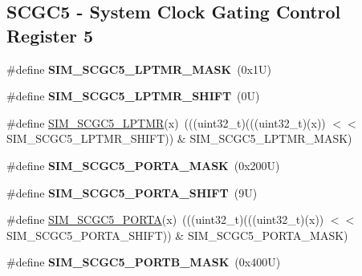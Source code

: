\subsection*{S\+C\+G\+C5 -\/ System Clock Gating Control Register 5}
\begin{DoxyCompactItemize}
\item 
\mbox{\label{group___s_i_m___register___masks_ga6f63b73e0ad63163df381c795d583cc1}} 
\#define {\bfseries S\+I\+M\+\_\+\+S\+C\+G\+C5\+\_\+\+L\+P\+T\+M\+R\+\_\+\+M\+A\+SK}~(0x1\+U)
\item 
\mbox{\label{group___s_i_m___register___masks_ga9b3669f3f4f380e18133785d6356c56c}} 
\#define {\bfseries S\+I\+M\+\_\+\+S\+C\+G\+C5\+\_\+\+L\+P\+T\+M\+R\+\_\+\+S\+H\+I\+FT}~(0\+U)
\item 
\#define \mbox{\hyperlink{group___s_i_m___register___masks_gab1ead6f54c5176113ceb9b609d7287b7}{S\+I\+M\+\_\+\+S\+C\+G\+C5\+\_\+\+L\+P\+T\+MR}}(x)~(((uint32\+\_\+t)(((uint32\+\_\+t)(x)) $<$$<$ S\+I\+M\+\_\+\+S\+C\+G\+C5\+\_\+\+L\+P\+T\+M\+R\+\_\+\+S\+H\+I\+FT)) \& S\+I\+M\+\_\+\+S\+C\+G\+C5\+\_\+\+L\+P\+T\+M\+R\+\_\+\+M\+A\+SK)
\item 
\mbox{\label{group___s_i_m___register___masks_ga9c4853233394870202cccd7844fc8a56}} 
\#define {\bfseries S\+I\+M\+\_\+\+S\+C\+G\+C5\+\_\+\+P\+O\+R\+T\+A\+\_\+\+M\+A\+SK}~(0x200\+U)
\item 
\mbox{\label{group___s_i_m___register___masks_gaa7a1683eaa07a5c5adcaddf4b99ed83a}} 
\#define {\bfseries S\+I\+M\+\_\+\+S\+C\+G\+C5\+\_\+\+P\+O\+R\+T\+A\+\_\+\+S\+H\+I\+FT}~(9\+U)
\item 
\#define \mbox{\hyperlink{group___s_i_m___register___masks_ga4f6394bfabad2f1c8669037fd0ea30e7}{S\+I\+M\+\_\+\+S\+C\+G\+C5\+\_\+\+P\+O\+R\+TA}}(x)~(((uint32\+\_\+t)(((uint32\+\_\+t)(x)) $<$$<$ S\+I\+M\+\_\+\+S\+C\+G\+C5\+\_\+\+P\+O\+R\+T\+A\+\_\+\+S\+H\+I\+FT)) \& S\+I\+M\+\_\+\+S\+C\+G\+C5\+\_\+\+P\+O\+R\+T\+A\+\_\+\+M\+A\+SK)
\item 
\mbox{\label{group___s_i_m___register___masks_ga5509cf72c7508dd77f0a1a9e631943e8}} 
\#define {\bfseries S\+I\+M\+\_\+\+S\+C\+G\+C5\+\_\+\+P\+O\+R\+T\+B\+\_\+\+M\+A\+SK}~(0x400\+U)
\item 

\end{DoxyCompactItemize}
